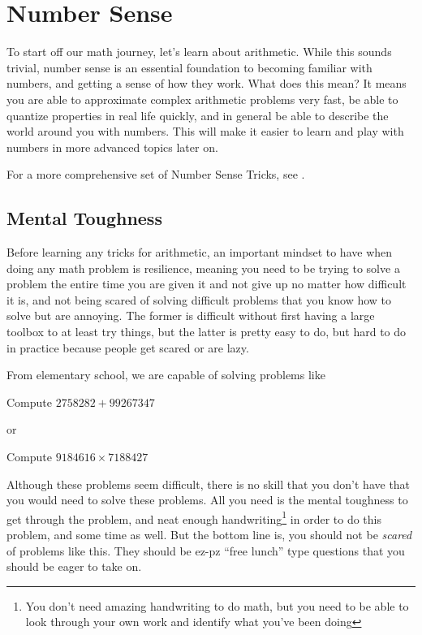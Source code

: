 \chapter{Number Sense}

To start off our math journey, let's learn about arithmetic. While this sounds trivial, number sense is an essential foundation to becoming familiar with numbers, and getting a sense of how they work.
What does this mean? It means you are able to approximate complex arithmetic problems very fast, be able to quantize properties in real life quickly, and in general be able to describe the world around you with numbers.
This will make it easier to learn and play with numbers in more advanced topics later on.

For a more comprehensive set of Number Sense Tricks, see \cite{heath_number_sense}.

\section{Mental Toughness}

Before learning any tricks for arithmetic, an important mindset to have when doing any math problem is resilience, meaning you need to be trying to solve a problem the entire time you are given it and not give up no matter how difficult it is, and not being scared of solving difficult problems that you know how to solve but are annoying.
The former is difficult without first having a large toolbox to at least try things, but the latter is pretty easy to do, but hard to do in practice because people get scared or are lazy.

From elementary school, we are capable of solving problems like

\begin{example}
  Compute $2758282 + 99267347$
\end{example}

or

\begin{example}
  Compute $9184616\times 7188427$
\end{example}

Although these problems seem difficult, there is no skill that you don't have that you would need to solve these problems. All you need is the mental toughness to get through the problem, and neat enough handwriting\footnote{You don't need amazing handwriting to do math, but you need to be able to look through your own work and identify what you've been doing}
in order to do this problem, and some time as well. But the bottom line is, you should not be \textit{scared} of problems like this. They should be ez-pz ``free lunch'' type questions that you should be eager to take on.

